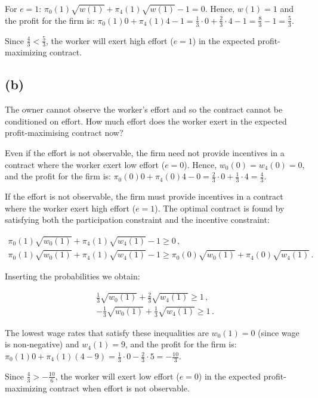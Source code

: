\documentclass{article}
\begin{document}
For $e=1$: $\pi_0(1)\sqrt{w(1)} + \pi_4(1)\sqrt{w(1)} - 1 = 0$. Hence, $w(1) = 1$ and the profit for the firm is: $\pi_0(1)0 + \pi_4(1)4 - 1 = \tfrac13 \cdot 0 + \tfrac23 \cdot 4 - 1= \tfrac83 - 1 = \tfrac53$.

Since $\tfrac43 < \tfrac53$, the worker will exert high effort ($e=1$) in the expected profit-maximizing contract.

\subsection*{(b)}The owner cannot observe the worker’s effort and so the contract cannot be conditioned on
effort. How much effort does the worker exert in the expected profit-maximising contract now?

\bigskip

Even if the effort is not observable, the firm need not provide incentives in a contract where the worker exert low effort ($e=0$). Hence, $w_0(0) = w_4(0) = 0$, and the profit for the firm is: $\pi_0(0)0 + \pi_4(0)4 - 0 = \tfrac23 \cdot 0 + \tfrac13 \cdot 4 = \tfrac43$.

If the effort is not observable, the firm must provide incentives in a contract where the worker exert high effort ($e=1$). The optimal contract is found by satisfying both the participation constraint and the incentive constraint:

\begin{gather*}
  \pi_0(1)\sqrt{w_0(1)} + \pi_4(1)\sqrt{w_4(1)} - 1 \geq 0  \, ,\\
  \pi_0(1)\sqrt{w_0(1)} + \pi_4(1)\sqrt{w_4(1)} - 1 \geq \pi_0(0)\sqrt{w_0(1)} + \pi_4(0)\sqrt{w_4(1)} \, .
\end{gather*}

Inserting the probabilities we obtain:

\begin{gather*}
  \tfrac13 \sqrt{w_0(1)} + \tfrac23 \sqrt{w_4(1)} \geq 1  \, ,\\
   -\tfrac13 \sqrt{w_0(1)} + \tfrac13 \sqrt{w_4(1)} \geq 1  \, .
\end{gather*}

The lowest wage rates that satisfy these inequalities are $w_0(1) = 0$ (since wage is non-negative) and $w_4(1) = 9$, and the profit for the firm is: $\pi_0(1)0 + \pi_4(1) \left( 4 - 9 \right) = \tfrac13 \cdot 0 - \tfrac23 \cdot 5 = - \tfrac{10}3$.

Since $\tfrac43 > - \tfrac{10}6$, the worker will exert low effort ($e=0$) in the expected profit-maximizing contract when effort is not observable.
\end{document}
